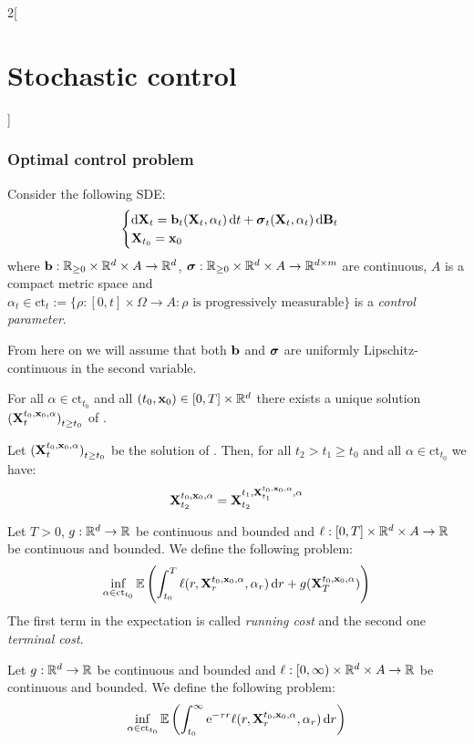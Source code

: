 \documentclass[../../../main_math.tex]{subfiles}
\begin{document}
\begin{multicols}{2}[\section{Stochastic control}]
  \subsubsection{Optimal control problem}
  \begin{definition}
    Consider the following SDE:
    \begin{equation}\label{SCO:SDE_control}
      \begin{cases}
        \dd{\boldsymbol{\mathrm{X}}_t}=\boldsymbol{\mathrm{b}}_t(\boldsymbol{\mathrm{X}}_t,\alpha_t)\dd{t}+\boldsymbol{\mathrm{\sigma}}_t(\boldsymbol{\mathrm{X}}_t,\alpha_t)\dd{\boldsymbol{\mathrm{B}}_t} \\
        \boldsymbol{\mathrm{X}}_{t_0}=\boldsymbol{\mathrm{x}}_0
      \end{cases}
    \end{equation}
    where $\boldsymbol{\mathrm{b}}:\mathbb{R}_{\geq 0}\times\mathbb{R}^d\times A\to\mathbb{R}^d$, $\boldsymbol{\mathrm{\sigma}}:\mathbb{R}_{\geq 0}\times\mathbb{R}^d\times A\to\mathbb{R}^{d\times m}$ are continuous, $A$ is a compact metric space and $\alpha_t\in \text{ct}_t:=\{\rho:[0,t]\times\Omega\to A:\rho\text{ is progressively measurable}\}$ is a \emph{control parameter}.
  \end{definition}
  From here on we will assume that both $\boldsymbol{\mathrm{b}}$ and $\boldsymbol{\mathrm{\sigma}}$ are uniformly Lipschitz-continuous in the second variable.
  \begin{theorem}
    For all $\alpha\in \text{ct}_{t_0}$ and all $(t_0,\boldsymbol{\mathrm{x}}_0)\in [0,T]\times\mathbb{R}^d$ there exists a unique solution ${(\boldsymbol{\mathrm{X}}_t^{t_0,\boldsymbol{\mathrm{x}}_0,\alpha})}_{t\geq t_0}$ of .
  \end{theorem}
  \begin{lemma}
    Let ${(\boldsymbol{\mathrm{X}}_t^{t_0,\boldsymbol{\mathrm{x}}_0,\alpha})}_{t\geq t_0}$ be the solution of . Then, for all $t_2>t_1\geq t_0$ and all $\alpha\in \text{ct}_{t_0}$ we have:
    $$
      \boldsymbol{\mathrm{X}}_{t_2}^{t_0,\boldsymbol{\mathrm{x}}_0,\alpha}=\boldsymbol{\mathrm{X}}_{t_2}^{t_1,\boldsymbol{\mathrm{X}}_{t_1}^{t_0,\boldsymbol{\mathrm{x}}_0,\alpha},\alpha}
    $$
  \end{lemma}
  \begin{definition}
    Let $T>0$, $g:\mathbb{R}^d\to\mathbb{R}$ be continuous and bounded and $\ell:[0,T]\times\mathbb{R}^d\times A\to\mathbb{R}$ be continuous and bounded. We define the following problem:
    $$
      \inf_{\alpha\in \text{ct}_{t_0}}\mathbb{E}\left(\int_{t_0}^T \ell(r,\boldsymbol{\mathrm{X}}_r^{t_0,\boldsymbol{\mathrm{x}}_0,\alpha},\alpha_r)\dd{r}+g(\boldsymbol{\mathrm{X}}_T^{t_0,\boldsymbol{\mathrm{x}}_0,\alpha})\right)
    $$
    The first term in the expectation is called \emph{running cost} and the second one \emph{terminal cost}.
  \end{definition}
  \begin{definition}
    Let $g:\mathbb{R}^d\to\mathbb{R}$ be continuous and bounded and $\ell:[0,\infty)\times\mathbb{R}^d\times A\to\mathbb{R}$ be continuous and bounded. We define the following problem:
    $$
      \inf_{\alpha\in \text{ct}_{t_0}}\mathbb{E}\left(\int_{t_0}^\infty \mathrm{e}^{-\tau r}\ell(r,\boldsymbol{\mathrm{X}}_r^{t_0,\boldsymbol{\mathrm{x}}_0,\alpha},\alpha_r)\dd{r}\right)
    $$
  \end{definition}
\end{multicols}
\end{document}
